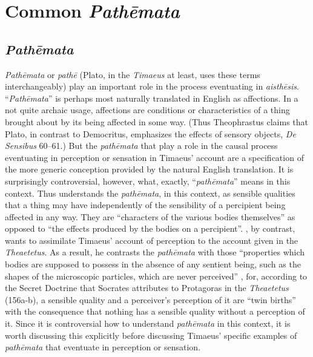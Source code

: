 
\chapter{Common \emph{Pathēmata}} %
\label{cha:common_pathemata}

\section{\emph{Pathēmata}} %
\label{sec:pathemata}

\emph{Pathēmata} or \emph{pathē} (Plato, in the \emph{Timaeus} at least, uses these terms interchangeably) play an important role in the process eventuating in \emph{aisthēsis}. ``\emph{Pathēmata}'' is perhaps most naturally translated in English as affections. In a not quite archaic usage, affections are conditions or characteristics of a thing brought about by its being affected in some way. (Thus Theophrastus claims that Plato, in contrast to Democritus, emphasizes the effects of sensory objects, \emph{De Sensibus} 60--61.) But the \emph{pathēmata} that play a role in the causal process eventuating in perception or sensation in Timaeus' account are a specification of the more generic conception provided by the natural English translation. It is surprisingly controversial, however, what, exactly, ``\emph{pathēmata}'' means in this context. Thus \citet[429-31]{Taylor:1928qb} understands the \emph{pathēmata}, in this context, as sensible qualities that a thing may have independently of the sensibility of a percipient being affected in any way. They are ``characters of the various bodies themselves'' as opposed to ``the effects produced by the bodies on a percipient''. \citet[258-9]{Cornford:1935fk}, by contrast, wants to assimilate Timaeus' account of perception to the account given in the \emph{Theaetetus}. As a result, he contrasts the \emph{pathēmata} with those ``properties which bodies are supposed to possess in the absence of any sentient being, such as the shapes of the microscopic particles, which are never perceived'' \citep[259]{Cornford:1935fk}, for, according to the Secret Doctrine that Socrates attributes to Protagoras in the \emph{Theaetetus} (156a-b), a sensible quality and a perceiver's perception of it are ``twin births'' with the consequence that nothing has a sensible quality without a perception of it. Since it is controversial how to understand \emph{pathēmata} in this context, it is worth discussing this explicitly before discussing Timaeus' specific examples of \emph{pathēmata} that eventuate in perception or sensation.

